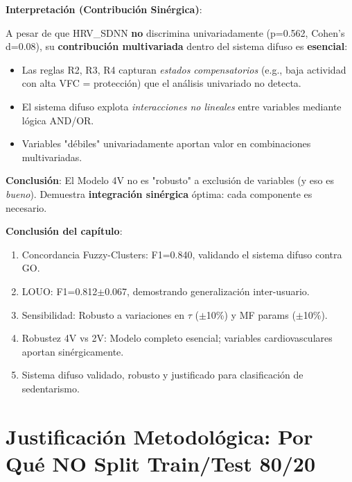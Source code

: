 \documentclass[12pt,letterpaper,twoside]{report}
\begin{document}
\begin{decisionbox}
\textbf{Interpretación (Contribución Sinérgica)}:

A pesar de que HRV\_SDNN \textbf{no} discrimina univariadamente (p=0.562, Cohen's d=0.08), su \textbf{contribución multivariada} dentro del sistema difuso es \textbf{esencial}:

\begin{itemize}[noitemsep]
    \item Las reglas R2, R3, R4 capturan \textit{estados compensatorios} (e.g., baja actividad con alta VFC = protección) que el análisis univariado no detecta.
    \item El sistema difuso explota \textit{interacciones no lineales} entre variables mediante lógica AND/OR.
    \item Variables "débiles" univariadamente aportan valor en combinaciones multivariadas.
\end{itemize}

\textbf{Conclusión}: El Modelo 4V no es "robusto" a exclusión de variables (y eso es \textit{bueno}). Demuestra \textbf{integración sinérgica} óptima: cada componente es necesario.
\end{decisionbox}

\begin{conclusionbox}
\textbf{Conclusión del capítulo}:

\begin{enumerate}[noitemsep]
    \item Concordancia Fuzzy-Clusters: F1=0.840, validando el sistema difuso contra GO.
    \item LOUO: F1=0.812$\pm$0.067, demostrando generalización inter-usuario.
    \item Sensibilidad: Robusto a variaciones en $\tau$ ($\pm$10\%) y MF params ($\pm$10\%).
    \item Robustez 4V vs 2V: Modelo completo esencial; variables cardiovasculares aportan sinérgicamente.
    \item Sistema difuso validado, robusto y justificado para clasificación de sedentarismo.
\end{enumerate}
\end{conclusionbox}

\chapter{Justificación Metodológica: Por Qué NO Split Train/Test 80/20}
\end{document}

